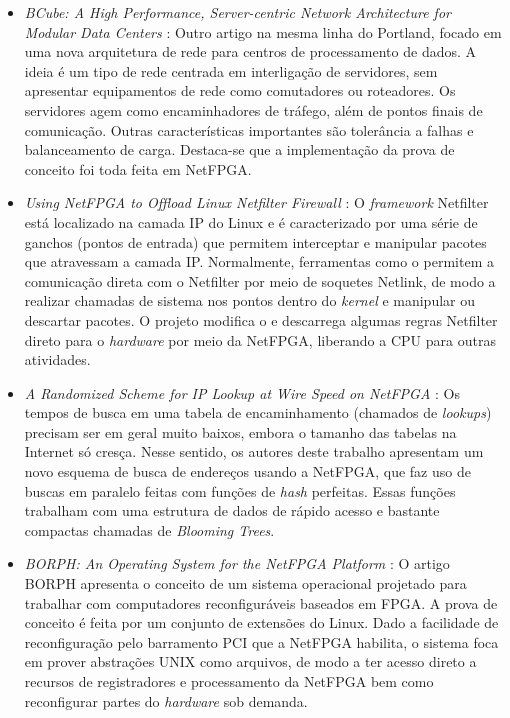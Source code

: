 \begin{itemize}
\item \textit{BCube: A High Performance, Server-centric Network
Architecture for Modular Data Centers}
\cite{Guo:2009:BHP:1592568.1592577}: Outro artigo na mesma linha do
Portland, focado em uma nova arquitetura de rede para centros de
processamento de dados. A ideia é um tipo de rede centrada em
interligação de servidores, sem apresentar equipamentos de rede como
comutadores ou roteadores. Os servidores agem como encaminhadores de
tráfego, além de pontos finais de comunicação. Outras características
importantes são tolerância a falhas e balanceamento de carga. Destaca-se
que a implementação da prova de conceito foi toda feita em NetFPGA.

\item \textit{Using NetFPGA to Offload Linux Netfilter Firewall}
\cite{netfilter}: O \emph{framework} Netfilter está localizado na camada
IP do Linux e é caracterizado por uma série de ganchos (pontos de
entrada) que permitem interceptar e manipular pacotes que atravessam a
camada IP. Normalmente, ferramentas como o  permitem a
comunicação direta com o Netfilter por meio de soquetes Netlink, de modo
a realizar chamadas de sistema nos pontos dentro do \emph{kernel} e
manipular ou descartar pacotes. O projeto modifica o  e
descarrega algumas regras Netfilter direto para o \emph{hardware} por
meio da NetFPGA, liberando a CPU para outras atividades.

\item \textit{A Randomized Scheme for IP Lookup at Wire Speed on
NetFPGA} \cite{5502019}: Os tempos de busca em uma tabela de
encaminhamento (chamados de \textit{lookups}) precisam ser em geral
muito baixos, embora o tamanho das tabelas na Internet só cresça. Nesse
sentido, os autores deste trabalho apresentam um novo esquema de busca
de endereços usando a NetFPGA, que faz uso de buscas em paralelo feitas
com funções de \textit{hash} perfeitas. Essas funções trabalham com uma
estrutura de dados de rápido acesso e bastante compactas chamadas de
\textit{Blooming Trees}.

\item \textit{BORPH: An Operating System for the NetFPGA Platform}
\cite{borph}: O artigo BORPH apresenta o conceito de um sistema
operacional projetado para trabalhar com computadores reconfiguráveis
baseados em FPGA. A prova de conceito é feita por um conjunto de
extensões do Linux. Dado a facilidade de reconfiguração pelo barramento
PCI que a NetFPGA habilita, o sistema foca em prover abstrações UNIX
como arquivos, de modo a ter acesso direto a recursos de registradores e
processamento da NetFPGA bem como reconfigurar partes do \emph{hardware}
sob demanda.


\end{itemize}
